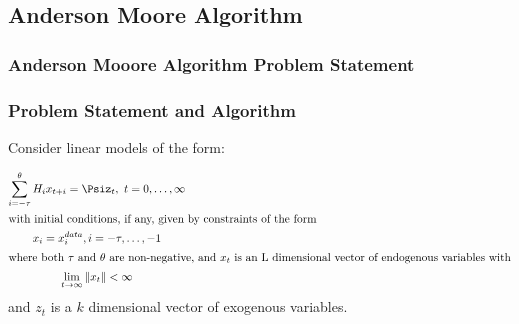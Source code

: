 \documentclass[tikz]{beamer}
\begin{document}
  



  

  




\subsection{Anderson Moore Algorithm }

  \subsubsection{Anderson Mooore Algorithm Problem Statement}


\begin{frame}
  \frametitle{Problem Statement and Algorithm}
  
{\small  

Consider linear models of the form\cite{anderson10}:


\begin{gather}
\sum_{i=-\tau}^\theta{H_i x_{t+i}}= \Psi%
z_{t}, \,\, t = 0,\ldots,\infty\label{eq:canonical}\\ \intertext{with initial conditions, if any, given by constraints of the form}%
x_i  =  x^{data}_i,  i =  - \tau, \ldots, -1\label{eq:init}\\ \intertext{where both $\tau$ and $\theta$ are non-negative, and $x_t$ is an L dimensional vector 
of endogenous variables with}%
\lim_{ t \rightarrow\infty} \|x_t\|   < \infty\label{eq:limit} %
\end{gather}
{ and $z_t$ is a $k$ dimensional vector of exogenous variables.}

}

\end{frame}
\end{document}
